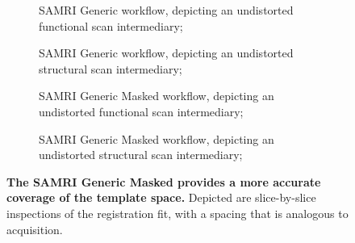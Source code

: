\begin{figure*}[h!]
	\centering
	\begin{subfigure}[t]{0.48\textwidth}
		\centering
		\setlength{\fboxsep}{0pt}%
		\setlength{\fboxrule}{0.2pt}%
		\caption{
			SAMRI Generic workflow, depicting an undistorted functional scan intermediary;
			\vspace{1em}
			}
		\label{fig:fit_gg}
	\end{subfigure}\hfill
	\begin{subfigure}[t]{0.48\textwidth}
		\centering
		\setlength{\fboxsep}{0pt}%
		\setlength{\fboxrule}{0.2pt}%
		\caption{
			SAMRI Generic workflow, depicting an undistorted structural scan intermediary;
			\vspace{1em}
			}
		\label{fig:fit_gga}
	\end{subfigure}
	\begin{subfigure}[t]{0.48\textwidth}
		\centering
		\setlength{\fboxsep}{0pt}%
		\setlength{\fboxrule}{0.2pt}%
		\caption{
			SAMRI Generic Masked workflow, depicting an undistorted functional scan intermediary;
			}
		\label{fig:fit_ll}
	\end{subfigure}\hfill
	\begin{subfigure}[t]{0.48\textwidth}
		\centering
		\setlength{\fboxsep}{0pt}%
		\setlength{\fboxrule}{0.2pt}%
		\caption{
			SAMRI Generic Masked workflow, depicting an undistorted structural scan intermediary;
			}
		\label{fig:fit_lg}
	\end{subfigure}
	\caption{
		\textbf{The SAMRI Generic Masked provides a more accurate coverage of the template space.}
		Depicted are slice-by-slice inspections of the registration fit, with a spacing that is analogous to acquisition.
		}
	\label{fig:fit}
\end{figure*}


